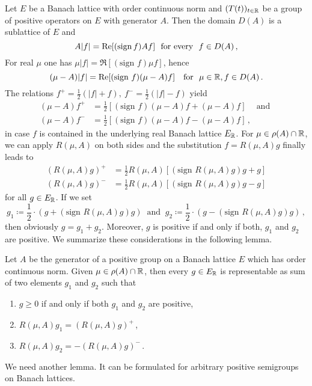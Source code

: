 Let $E$ be a Banach lattice with order continuous norm and $(T(t))_{t \in \R }$
be a group of positive operators on $E$ with generator $A$.
Then the domain $D(A)$ is a sublattice of $E$ and
\begin{equation}\label{eq:c3-4.8}
	A|f| = \Re [(\text{sign\,} f)Af] \ \text{ for every } \ f \in D(A)\,,
\end{equation}
For real $\mu$ one has $\mu|f| = \Re [(\text{sign } f)\mu f]$, hence
\[
(\mu - A)|f| = \Re[(\text{sign } f)(\mu - A)f] \ \ \text{ for } \ \mu \in \R , f \in D(A)\,.
\]
The relations $f^+ = \frac{1}{2}(|f| + f), \ f^- = \frac{1}{2}(|f| - f)$ yield
\begin{align*}
(\mu - A)f^+ &= \frac{1}{2}[(\text{sign } f)(\mu - A)f + (\mu - A)f] \quad\ \text{and }\\
(\mu - A)f^- &= \frac{1}{2}[(\text{sign } f)(\mu - A)f - (\mu - A)f]\,,
\end{align*}
in case $f$ is contained in the underlying real Banach lattice $E_{\R }$.
For $\mu \in \rho(A) \cap \R $, we can apply $R(\mu,A)$ on both sides and the substitution $f = R(\mu,A)g$ finally leads to
\begin{equation}\label{eq:c3-4.9}
	\begin{aligned}
	(R(\mu,A)g)^+ &= \frac{1}{2}R(\mu,A) [(\text{sign } R(\mu,A)g)g + g] \\
	(R(\mu,A)g)^- &= \frac{1}{2}R(\mu,A) [(\text{sign } R(\mu,A)g)g - g]
	\end{aligned}
\end{equation}
for all $g \in E_{\R }$. If we set 
\[ 
g_1 \coloneqq \frac{1}{2}\cdot(g + (\text{sign } R(\mu,A)g)g) \ \text{ and } \ 
g_2 \coloneqq \frac{1}{2}\cdot(g - (\text{sign } R(\mu,A)g)g)\,,
\]
then obviously $g = g_1 + g_2$. Moreover, $g$ is positive if and only if
both, $g_1$ and $g_2$ are positive. We summarize these considerations in the following lemma.
\begin{lemma}\label{lem:c3-4.6}
Let $A$ be the generator of a positive group on a Banach
lattice $E$ which has order continuous norm. Given $\mu \in \rho(A) \cap \R $, then
every $g \in E_{\R }$ is representable as sum of two elements $g_1$ and $g_2$
such that
\begin{enumerate}[\upshape (i)]
	\item 
	$g \geq 0$ if and only if both $g_1$ and $g_2$ are positive,
	
	\item
	$R(\mu,A)g_1 = (R(\mu,A)g)^+$\,,

	\item
	$R(\mu,A)g_2 = -(R(\mu,A)g)^-$\,.
\end{enumerate}	
\end{lemma}
We need another lemma. It can be formulated for arbitrary positive
semigroups on Banach lattices.

